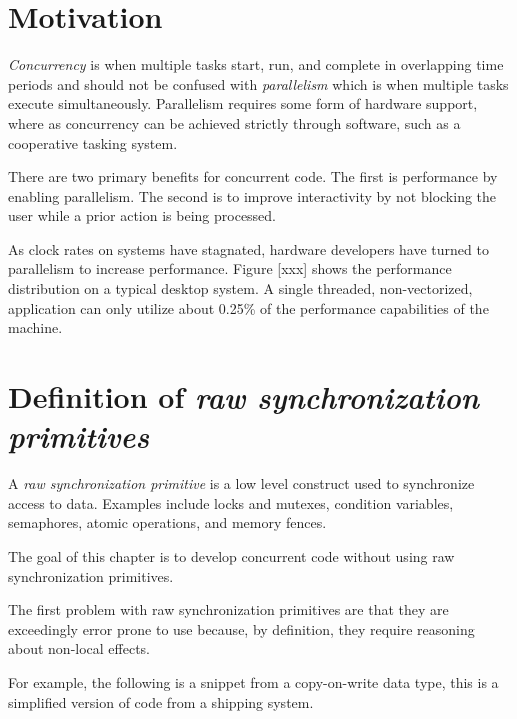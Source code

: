 \section{Motivation}


\textit{Concurrency} is when multiple tasks start, run, and complete in overlapping time periods and should not be confused with \textit{parallelism} which is when multiple tasks execute simultaneously. Parallelism requires some form of hardware support, where as concurrency can be achieved strictly through software, such as a cooperative tasking system.

There are two primary benefits for concurrent code. The first is performance by enabling parallelism. The second is to improve interactivity by not blocking the user while a prior action is being processed.

As clock rates on systems have stagnated, hardware developers have turned to parallelism to increase performance. Figure [xxx] shows the performance distribution on a typical desktop system. A single threaded, non-vectorized, application can only utilize about 0.25\% of the performance capabilities of the machine.

\section{Definition of \textit{raw synchronization primitives}}

A \textit{raw synchronization primitive} is a low level construct used to synchronize access to data. Examples include locks and mutexes, condition variables, semaphores, atomic operations, and memory fences.


The goal of this chapter is to develop concurrent code without using raw synchronization primitives.

The first problem with raw synchronization primitives are that they are exceedingly error prone to use because, by definition, they require reasoning about non-local effects.

For example, the following is a snippet from a copy-on-write data type, this is a simplified version of code from a shipping system. 

